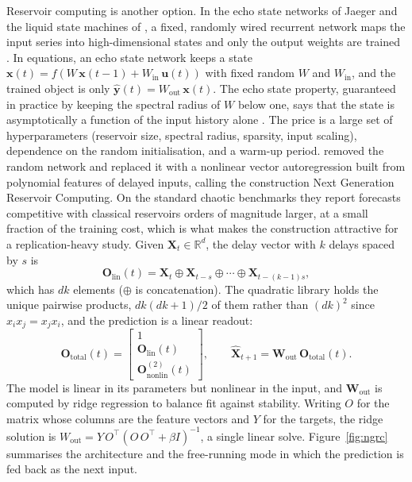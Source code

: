\documentclass[12pt,a4paper]{article}
\begin{document}
Reservoir computing is another option. In the echo state networks of
Jaeger and the liquid state machines of \citet{maass2002}, a fixed,
randomly wired recurrent network maps the input series into
high-dimensional states and only the output weights are trained
\citep{jaegerhaas2004,lukosevicius2009,nakajima2021}. In equations, an echo state network keeps a state
$\mathbf{x}(t) = f\!\left(W\,\mathbf{x}(t-1) + W_{\mathrm{in}}\,
\mathbf{u}(t)\right)$ with fixed random $W$ and $W_{\mathrm{in}}$, and
the trained object is only $\hat{\mathbf{y}}(t) = W_{\mathrm{out}}\,
\mathbf{x}(t)$. The echo state property, guaranteed in practice by
keeping the spectral radius of $W$ below one, says that the state is
asymptotically a function of the input history alone
\citep{jaegerhaas2004}. The price is a
large set of hyperparameters (reservoir size, spectral radius, sparsity,
input scaling), dependence on the random initialisation, and a warm-up
period. \citet{gauthier2021} removed the random network and replaced it
with a nonlinear vector autoregression built from polynomial features of
delayed inputs, calling the construction Next Generation Reservoir
Computing. On the standard chaotic benchmarks they report forecasts
competitive with classical reservoirs orders of magnitude larger, at a
small fraction of the training cost, which is what makes the
construction attractive for a replication-heavy study. Given $\mathbf{X}_t \in \mathbb{R}^d$, the delay vector with
$k$ delays spaced by $s$ is
\begin{equation}
\mathbf{O}_{\mathrm{lin}}(t) = \mathbf{X}_t \oplus \mathbf{X}_{t-s} \oplus
\cdots \oplus \mathbf{X}_{t-(k-1)s},
\end{equation}
which has $dk$ elements ($\oplus$ is concatenation). The quadratic library
holds the unique pairwise products, $dk(dk+1)/2$ of them rather than
$(dk)^2$ since $x_i x_j = x_j x_i$, and the prediction is a linear
readout:
\begin{equation}
\mathbf{O}_{\mathrm{total}}(t) =
\begin{bmatrix}
1 \\ \mathbf{O}_{\mathrm{lin}}(t) \\ \mathbf{O}_{\mathrm{nonlin}}^{(2)}(t)
\end{bmatrix},
\qquad
\hat{\mathbf{X}}_{t+1} = \mathbf{W}_{\mathrm{out}}\,
\mathbf{O}_{\mathrm{total}}(t).
\end{equation}
The model is linear in its parameters but nonlinear in the input, and
$\mathbf{W}_{\mathrm{out}}$ is computed by ridge regression to balance fit
against stability. Writing $O$ for the matrix whose columns are the
feature vectors and $Y$ for the targets, the ridge solution is
$W_{\mathrm{out}} = Y\,O^{\top}\left(O\,O^{\top} +
\beta I\right)^{-1}$, a single linear solve. Figure~\ref{fig:ngrc}
summarises the architecture and the free-running mode in which the
prediction is fed back as the next input.
\end{document}
